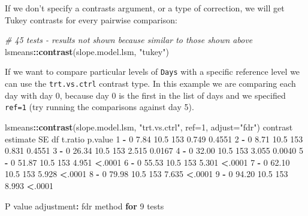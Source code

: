 \documentclass[]{article}
\newenvironment{Shaded}{\begin{snugshade}}{\end{snugshade}}
\newcommand{\CommentTok}[1]{\textcolor[rgb]{0.56,0.35,0.01}{\textit{#1}}}
\newcommand{\ControlFlowTok}[1]{\textcolor[rgb]{0.13,0.29,0.53}{\textbf{#1}}}
\newcommand{\DataTypeTok}[1]{\textcolor[rgb]{0.13,0.29,0.53}{#1}}
\newcommand{\DecValTok}[1]{\textcolor[rgb]{0.00,0.00,0.81}{#1}}
\newcommand{\FloatTok}[1]{\textcolor[rgb]{0.00,0.00,0.81}{#1}}
\newcommand{\KeywordTok}[1]{\textcolor[rgb]{0.13,0.29,0.53}{\textbf{#1}}}
\newcommand{\NormalTok}[1]{#1}
\newcommand{\OperatorTok}[1]{\textcolor[rgb]{0.81,0.36,0.00}{\textbf{#1}}}
\newcommand{\StringTok}[1]{\textcolor[rgb]{0.31,0.60,0.02}{#1}}
\begin{document}
If we don't specify a contrasts argument, or a type of correction, we will get
Tukey contrasts for every pairwise comparison:

\begin{Shaded}
\begin{Highlighting}[]
\CommentTok{# 45 tests - results not shown because similar to those shown above}
\NormalTok{lsmeans}\OperatorTok{::}\KeywordTok{contrast}\NormalTok{(slope.model.lsm, }\StringTok{"tukey"}\NormalTok{)}
\end{Highlighting}
\end{Shaded}

If we want to compare particular levels of \texttt{Days} with a specific reference
level we can use the \texttt{trt.vs.ctrl} contrast type. In this example we are
comparing each day with day 0, because day 0 is the first in the list of days
and we specified \texttt{ref=1} (try running the comparisons against day 5).

\begin{Shaded}
\begin{Highlighting}[]
\NormalTok{lsmeans}\OperatorTok{::}\KeywordTok{contrast}\NormalTok{(slope.model.lsm, }\StringTok{"trt.vs.ctrl"}\NormalTok{, }\DataTypeTok{ref=}\DecValTok{1}\NormalTok{, }\DataTypeTok{adjust=}\StringTok{"fdr"}\NormalTok{)}
\NormalTok{ contrast estimate   SE  df t.ratio p.value}
 \DecValTok{1} \OperatorTok{-}\StringTok{ }\DecValTok{0}        \FloatTok{7.84} \FloatTok{10.5} \DecValTok{153} \FloatTok{0.749}   \FloatTok{0.4551} 
 \DecValTok{2} \OperatorTok{-}\StringTok{ }\DecValTok{0}        \FloatTok{8.71} \FloatTok{10.5} \DecValTok{153} \FloatTok{0.831}   \FloatTok{0.4551} 
 \DecValTok{3} \OperatorTok{-}\StringTok{ }\DecValTok{0}       \FloatTok{26.34} \FloatTok{10.5} \DecValTok{153} \FloatTok{2.515}   \FloatTok{0.0167} 
 \DecValTok{4} \OperatorTok{-}\StringTok{ }\DecValTok{0}       \FloatTok{32.00} \FloatTok{10.5} \DecValTok{153} \FloatTok{3.055}   \FloatTok{0.0040} 
 \DecValTok{5} \OperatorTok{-}\StringTok{ }\DecValTok{0}       \FloatTok{51.87} \FloatTok{10.5} \DecValTok{153} \FloatTok{4.951}   \OperatorTok{<}\NormalTok{.}\DecValTok{0001} 
 \DecValTok{6} \OperatorTok{-}\StringTok{ }\DecValTok{0}       \FloatTok{55.53} \FloatTok{10.5} \DecValTok{153} \FloatTok{5.301}   \OperatorTok{<}\NormalTok{.}\DecValTok{0001} 
 \DecValTok{7} \OperatorTok{-}\StringTok{ }\DecValTok{0}       \FloatTok{62.10} \FloatTok{10.5} \DecValTok{153} \FloatTok{5.928}   \OperatorTok{<}\NormalTok{.}\DecValTok{0001} 
 \DecValTok{8} \OperatorTok{-}\StringTok{ }\DecValTok{0}       \FloatTok{79.98} \FloatTok{10.5} \DecValTok{153} \FloatTok{7.635}   \OperatorTok{<}\NormalTok{.}\DecValTok{0001} 
 \DecValTok{9} \OperatorTok{-}\StringTok{ }\DecValTok{0}       \FloatTok{94.20} \FloatTok{10.5} \DecValTok{153} \FloatTok{8.993}   \OperatorTok{<}\NormalTok{.}\DecValTok{0001} 

\NormalTok{P value adjustment}\OperatorTok{:}\StringTok{ }\NormalTok{fdr method }\ControlFlowTok{for} \DecValTok{9}\NormalTok{ tests }
\end{Highlighting}
\end{Shaded}
\end{document}
